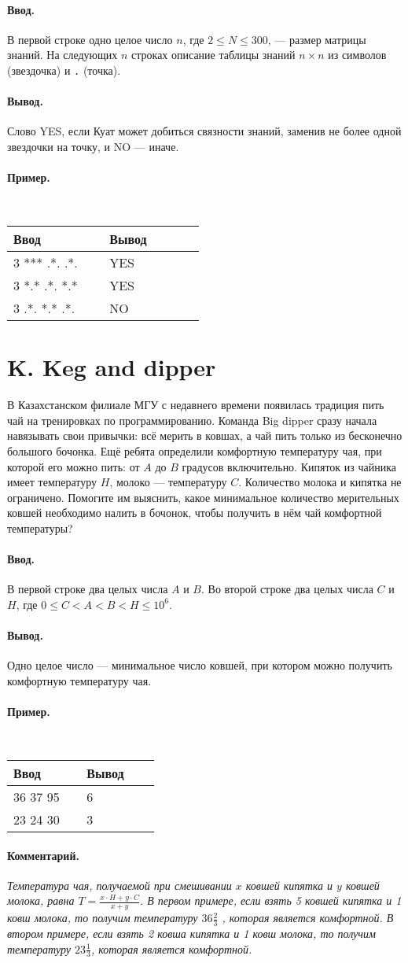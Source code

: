 \documentclass[10pt, a5paper]{article}
\newcommand{\informat}[1]
{
	\paragraph{Ввод.\\} #1
}
\newcommand{\outformat}[1]
{
	\paragraph{Вывод.\\} #1
}
\newcommand{\examplee}[4]
{
	\paragraph{Пример.\\}
	{\tt
	\begin{tabular}{|p{0.4\linewidth}|p{0.4\linewidth}|}
	\hline
	Ввод 	& Вывод  	\\
	\hline
	#1 		& #2 		\\
	\hline
	#3		& #4		\\
	\hline
	\end{tabular}
	}
}
\newcommand{\exampleee}[6]
{
	\paragraph{Пример.\\}
	{\tt
	\begin{tabular}{|p{0.4\linewidth}|p{0.4\linewidth}|}
	\hline
	Ввод 	& Вывод  	\\
	\hline
	#1 		& #2 		\\
	\hline
	#3		& #4		\\
	\hline
	#5		& #6		\\
	\hline
	\end{tabular}
	}
}
\newcommand{\excomm}[1]
{
	\paragraph{Комментарий. \\}
	\textit{#1}
}
\begin{document}
\informat{В первой строке одно целое число $n$, где $2 \le N \le 300$, --- размер матрицы знаний. \newline
На следующих $n$ строках описание таблицы знаний $n \times n$ из символов {\tt *} (звездочка) и {\tt .} (точка).}

\outformat{Слово YES, если Куат может добиться связности знаний, заменив не более одной звездочки на точку, и NO --- иначе.}

\exampleee
{3 \newline
*** \newline
.*. \newline
.*.
}{YES}
{3 \newline
*.* \newline
.*. \newline
*.*
}{YES}
{3 \newline
.*. \newline
*.* \newline
.*.
}{NO}



\section*{K. Keg and dipper}

В Казахстанском филиале МГУ с недавнего времени появилась традиция пить чай на тренировках по программированию. Команда Big dipper сразу начала навязывать свои привычки: всё мерить в ковшах, а чай пить только из бесконечно большого бочонка. Ещё ребята определили комфортную температуру чая, при которой его можно пить: от $A$ до $B$ градусов включительно. Кипяток из чайника имеет температуру $H$, молоко --- температуру $C$. Количество молока и кипятка не ограничено. Помогите им выяснить, какое минимальное количество мерительных ковшей необходимо налить в бочонок, чтобы получить в нём чай комфортной температуры?

\informat{В первой строке два целых числа $A$ и $B$. \newline
Во второй строке два целых числа $C$ и $H$, где $0 \le C < A < B < H \le 10^6$.}

\outformat{Одно целое число --- минимальное число ковшей, при котором можно получить комфортную температуру чая.}

\examplee
{36 37 \newline
25 95}{6}
{23 24 \newline
20 30
}{3}

\excomm{Температура чая, получаемой при смешивании $x$ ковшей кипятка и $y$ ковшей молока, равна $T = \frac{x \cdot H + y \cdot C}{x + y}$. \newline
В первом примере, если взять 5 ковшей кипятка и 1 ковш молока, то получим температуру $36 \frac23$ , которая является комфортной. \newline В втором примере, если взять 2 ковша кипятка и 1 ковш молока, то получим температуру $23 \frac13$, которая является комфортной.}
\end{document}
